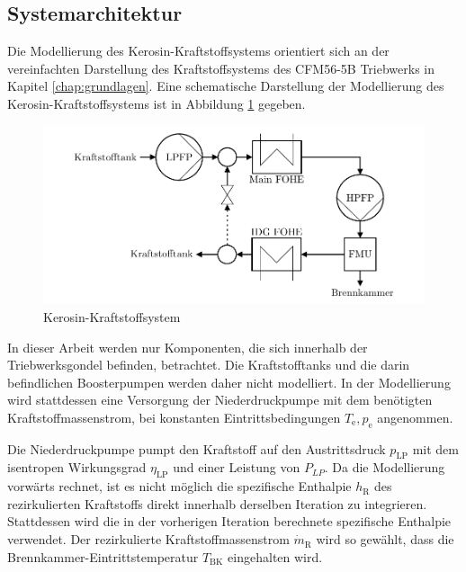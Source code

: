\subsection{Systemarchitektur}

Die Modellierung des Kerosin-Kraftstoffsystems orientiert sich an der vereinfachten Darstellung des Kraftstoffsystems des CFM56-5B Triebwerks in Kapitel \ref{chap:grundlagen}. Eine schematische Darstellung der Modellierung des Kerosin-Kraftstoffsystems ist in Abbildung \ref{fig:Referenz} gegeben.

\begin{figure}[ht]
\centering
\includegraphics[width=1\linewidth]{4_Abbildungen/2_Hauptteil/Kraftstoffsystem Abbildungen/Referenz.pdf}
  \caption{Kerosin-Kraftstoffsystem}
  \label{fig:Referenz}
\end{figure}
\FloatBarrier 

In dieser Arbeit werden nur Komponenten, die sich innerhalb der Triebwerksgondel befinden, betrachtet. Die Kraftstofftanks und die darin befindlichen Boosterpumpen werden daher nicht modelliert. In der Modellierung wird stattdessen eine Versorgung der Niederdruckpumpe mit dem benötigten Kraftstoffmassenstrom, bei konstanten Eintrittsbedingungen $T_\mathrm{e}, p_\mathrm{e}$ angenommen. 

Die Niederdruckpumpe pumpt den Kraftstoff auf den Austrittsdruck $p_{\mathrm{LP}}$ mit dem isentropen Wirkungsgrad $\eta_{\mathrm{LP}}$ und einer Leistung von $P_{LP}$. Da die Modellierung vorwärts rechnet, ist es nicht möglich die spezifische Enthalpie $h_\mathrm{R}$ des rezirkulierten Kraftstoffs direkt innerhalb derselben Iteration zu integrieren. Stattdessen wird die in der vorherigen Iteration berechnete spezifische Enthalpie verwendet. Der rezirkulierte Kraftstoffmassenstrom $\dot{m}_\mathrm{R}$ wird so gewählt, dass die Brennkammer-Eintrittstemperatur $T_{\mathrm{BK}}$ eingehalten wird. 

